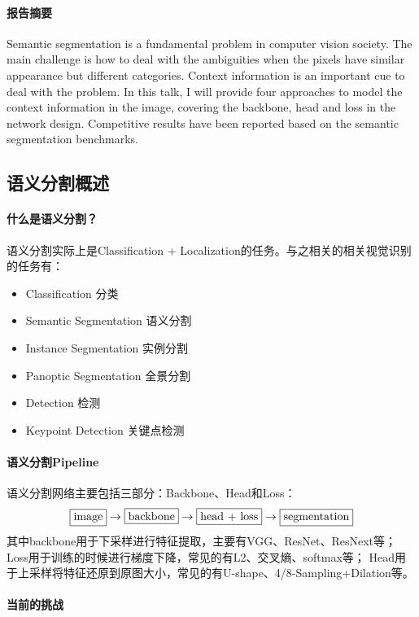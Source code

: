\documentclass[UTF8, a4paper]{ctexart}
\begin{document}
\paragraph{报告摘要}
Semantic segmentation is a fundamental problem in computer vision society. 
The main challenge is how to deal with the ambiguities when the pixels have similar appearance but different categories. 
Context information is an important cue to deal with the problem. 
In this talk, I will provide four approaches to model the context information in the image, covering the backbone, head and loss in the network design. 
Competitive results have been reported based on the semantic segmentation benchmarks.

\subsection{语义分割概述}

\paragraph{什么是语义分割？}
语义分割实际上是Classification + Localization的任务。与之相关的相关视觉识别的任务有：
\begin{itemize}
    \item Classification 分类
    \item Semantic Segmentation 语义分割
    \item Instance Segmentation 实例分割
    \item Panoptic Segmentation 全景分割
    \item Detection 检测
    \item Keypoint Detection 关键点检测
\end{itemize}

\paragraph{语义分割Pipeline}

语义分割网络主要包括三部分：Backbone、Head和Loss：
$$\fbox{image} \rightarrow \fbox{backbone} \rightarrow \fbox{head + loss} \rightarrow \fbox{segmentation}$$
其中backbone用于下采样进行特征提取，主要有VGG、ResNet、ResNext等；
Loss用于训练的时候进行梯度下降，常见的有L2、交叉熵、softmax等；
Head用于上采样将特征还原到原图大小，常见的有U-shape、4/8-Sampling+Dilation等。

\paragraph{当前的挑战}
\end{document}
